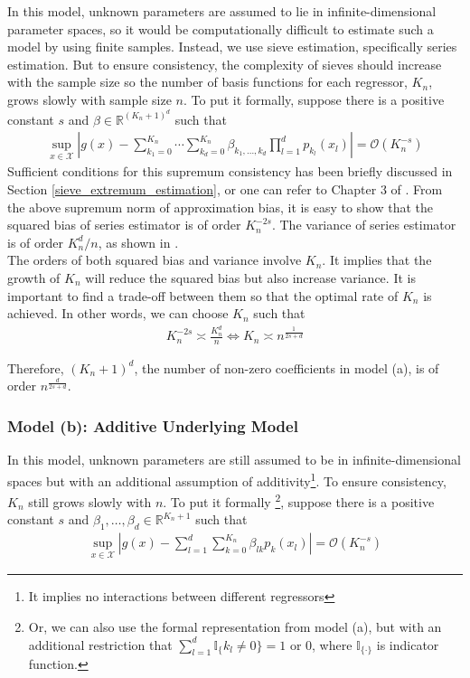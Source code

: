 \documentclass[12pt, a4paper]{article}
\theoremstyle{MAstyle} \newtheorem{assumption}{Assumption}[section]
\theoremstyle{MAstyle} \newtheorem{definition}{Definition}[section]
\theoremstyle{MAstyle} \newtheorem{theorem}{Theorem}[section]
\theoremstyle{MAstyle} \newtheorem{corollary}{Corollary}[section]
\begin{document}
                In this model, unknown parameters are assumed to lie in infinite-dimensional parameter spaces, so it would be computationally difficult to estimate such a model by using finite samples. Instead, we use sieve estimation, specifically series estimation. But to ensure consistency, the complexity of sieves should increase with the sample size so the number of basis functions for each regressor, $K_n$, grows slowly with sample size $n$. To put it formally, suppose there is a positive constant $s$ and $\beta \in \mathbb{R}^{(K_n+1)^d}$ such that
                \begin{align}
                     \sup_{x \in \mathcal{X}} \left| g(x) - \sum_{k_1=0}^{K_n} \cdots \sum_{k_d=0}^{K_n} \beta_{k_1,\ldots,k_d}\prod_{l=1}^{d}p_{k_l}(x_l) \right|=\mathcal{O}(K_n^{-s})
                \end{align}
                Sufficient conditions for this supremum consistency has been briefly discussed in Section \ref{sieve_extremum_estimation}, or one can refer to Chapter 3 of \cite{Chen_2007}. From the above supremum norm of approximation bias, it is easy to show that the squared bias of series estimator is of order $K_n^{-2s}$. The variance of series estimator is of order $K_n^d/n$, as shown in \cite{Newey_1997}. \\
                
                The orders of both squared bias and variance involve $K_n$. It implies that the growth of $K_n$ will reduce the squared bias but also increase variance. It is important to find a trade-off between them so that the optimal rate of $K_n$ is achieved. In other words, we can choose $K_n$ such that
                \begin{align*}
                    K_n^{-2s} \asymp \frac{K_n^d}{n}  \Leftrightarrow  K_n \asymp n^{\frac{1}{2s+d}}
                \end{align*}

                Therefore, $(K_n+1)^d$, the number of non-zero coefficients in model (a), is of order $n^{\frac{d}{2s+d}}$.

                \subsubsection{Model (b): Additive Underlying Model}\label{additive_model}

                In this model, unknown parameters are still assumed to be in infinite-dimensional spaces but with an additional assumption of additivity\footnote{It implies no interactions between different regressors}. To ensure consistency, $K_n$ still grows slowly with $n$. To put it formally \footnote{Or, we can also use the formal representation from model (a), but with an additional restriction that $\sum_{l=1}^{d} \mathds{I}_\{k_l\not=0\}=1$ or $0$, where $\mathds{I}_{\{\cdot\}}$ is indicator function.}, suppose there is a positive constant $s$ and $\beta_1, \ldots, \beta_d \in \mathbb{R}^{K_n+1}$ such that
                \begin{align}
                    \sup_{x \in \mathcal{X}} \left| g(x) - \sum_{l=1}^{d} \sum_{k=0}^{K_n} \beta_{lk}p_k(x_l) \right|=\mathcal{O}(K_n^{-s})
                \end{align}
\end{document}
